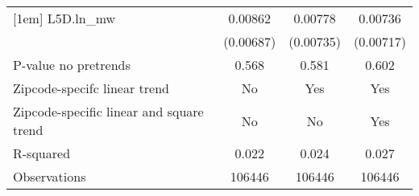 {\begin{tabular}{l*{3}{c}}
[1em]
L5D.ln\_mw &  0.00862         &  0.00778         &  0.00736         \\
          &(0.00687)         &(0.00735)         &(0.00717)         \\
\hline
P-value no pretrends&    0.568         &    0.581         &    0.602         \\
Zipcode-specifc linear trend&       No         &      Yes         &      Yes         \\
Zipcode-specific linear and square trend&       No         &       No         &      Yes         \\
R-squared &    0.022         &    0.024         &    0.027         \\
Observations&   106446         &   106446         &   106446         \\
\hline\hline
\end{tabular}
}
